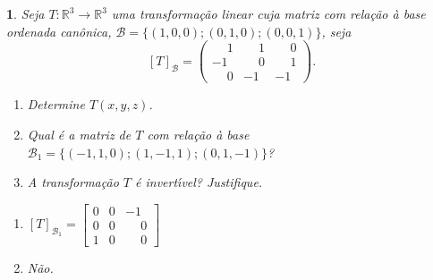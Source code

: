 \documentclass[12pt]{exam}
\newtheorem{exercicio}{}
\newcommand{\real}{\mathbb{R}}
\begin{document}
\begin{exercicio}
  Seja $T : \real^3 \to \real^3$ uma transforma\c{c}\~ao linear cuja matriz com rela\c{c}\~ao \`a base ordenada can\^onica, $\mathcal{B} = \{(1,0,0); (0,1,0); (0,0,1)\}$, seja
  \[
    [T]_\mathcal{B} = \begin{pmatrix}
      \phantom{-}1 & \phantom{-}1 & \phantom{-}0\\
      -1 & \phantom{-}0 & \phantom{-}1\\
      \phantom{-}0 & -1 & -1
    \end{pmatrix}.
  \]
    \begin{enumerate}[label=({\alph*})]
      \item Determine $T(x,y,z)$.
      \item Qual \'e a matriz de $T$ com rela\c{c}\~ao \`a base $\mathcal{B}_1 = \{(-1,1,0);(1,-1,1);(0,1,-1)\}$?
      \item A transforma\c{c}\~ao $T$ \'e invert{\'\i}vel? Justifique.
    \end{enumerate}
    \begin{solucao}
      \begin{enumerate}
        \item[b)] $[T]_{\mathcal{B}_1} = \begin{bmatrix}
          0 & 0 & -1\\
          0 & 0 & \phantom{-}0\\
          1 & 0 & \phantom{-}0
        \end{bmatrix}$
        \item[c)] N\~ao.
      \end{enumerate}
    \end{solucao}
\end{exercicio}
\end{document}

